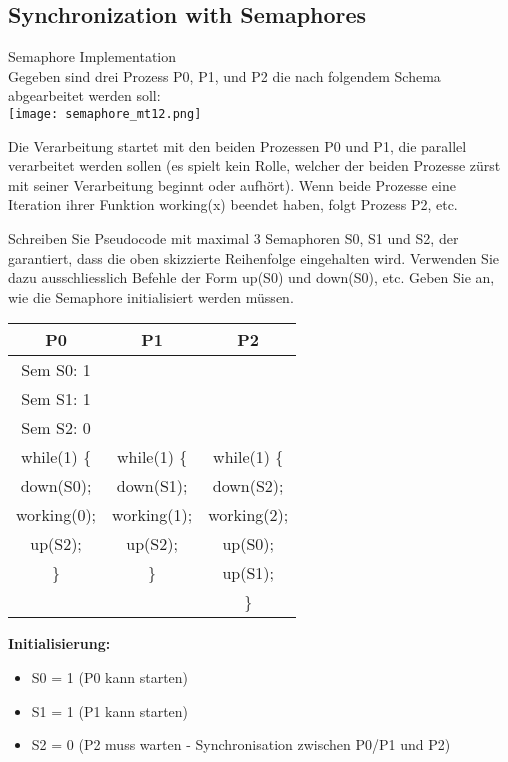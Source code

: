 \subsection{Synchronization with Semaphores}

\begin{example2}{Semaphore Implementation}\\
    Gegeben sind drei Prozess P0, P1, und P2 die nach folgendem Schema abgearbeitet werden soll:\\
    \texttt{[image: semaphore\_mt12.png]}
    
    Die Verarbeitung startet mit den beiden Prozessen P0 und P1, die parallel verarbeitet werden sollen (es spielt kein Rolle, welcher der beiden Prozesse zürst mit seiner Verarbeitung beginnt oder aufhört). Wenn beide Prozesse eine Iteration ihrer Funktion working(x) beendet haben, folgt Prozess P2, etc.
    
    Schreiben Sie Pseudocode mit maximal 3 Semaphoren S0, S1 und S2, der garantiert, dass die oben skizzierte Reihenfolge eingehalten wird. Verwenden Sie dazu ausschliesslich Befehle der Form up(S0) und down(S0), etc. Geben Sie an, wie die Semaphore initialisiert werden müssen.
    
    \tcblower
    
    \begin{center}
    \begin{tabular}{|c|c|c|}
    \hline
    \textbf{P0} & \textbf{P1} & \textbf{P2} \\
    \hline
    Sem S0: 1 &  & \\
    Sem S1: 1 &  & \\
    Sem S2: 0 &  & \\
    \hline
    while(1) \{ & while(1) \{ & while(1) \{ \\
    \quad \quad down(S0); & \quad \quad down(S1); & \quad \quad down(S2); \\
    \quad \quad working(0); & \quad \quad working(1); & \quad \quad working(2); \\
    \quad \quad up(S2); & \quad \quad up(S2); & \quad \quad up(S0); \\
    \} & \} & \quad \quad up(S1); \\
     &  & \} \\
    \hline
    \end{tabular}
    \end{center}
    
    \textbf{Initialisierung:}
    \begin{itemize}
        \item S0 = 1 (P0 kann starten)
        \item S1 = 1 (P1 kann starten) 
        \item S2 = 0 (P2 muss warten - Synchronisation zwischen P0/P1 und P2)
    \end{itemize}
    

\end{example2}
